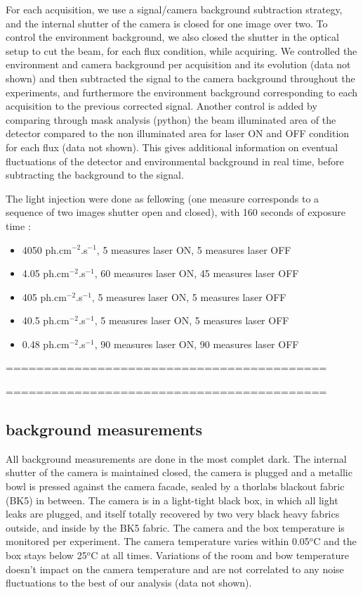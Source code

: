 \documentclass{article}
\begin{document}
For each acquisition, we use a signal/camera background subtraction strategy, and the internal shutter of the camera is closed for one image over two. 
To control the environment background, we also closed the shutter in the optical setup to cut the beam, for each flux condition, while acquiring.
We controlled the environment and camera background per acquisition and its evolution (data not shown) and then subtracted the signal to the camera background throughout the experiments, and furthermore the environment background corresponding to each acquisition to the previous corrected signal.
Another control is added by comparing through mask analysis (python) the beam illuminated area of the detector compared to the non illuminated area for laser ON and OFF condition for each flux (data not shown). 
This gives additional information on eventual fluctuations of the detector and environmental background in real time, before subtracting the background to the signal.


The light injection were done as fellowing (one measure corresponds to a sequence of two images shutter open and closed), with 160 seconds of exposure time : 
\begin{itemize}
	\item  4050 ph.cm$^{-2}$.s$^{-1}$, 5 measures laser ON, 5 measures laser OFF
	\item  4.05 ph.cm$^{-2}$.s$^{-1}$, 60 measures laser ON, 45 measures laser OFF
	\item  405 ph.cm$^{-2}$.s$^{-1}$, 5 measures laser ON, 5 measures laser OFF
	\item  40.5 ph.cm$^{-2}$.s$^{-1}$, 5 measures laser ON, 5 measures laser OFF
	\item  0.48 ph.cm$^{-2}$.s$^{-1}$, 90 measures laser ON, 90 measures laser OFF
\end{itemize}




==========================================

==========================================

\subsection{background measurements}

All background measurements are done in the most complet dark.
The internal shutter of the camera is maintained closed, the camera is plugged and a metallic bowl is pressed against the camera facade, sealed by a thorlabs blackout fabric (BK5) in between.
The camera is in a light-tight black box, in which all light leaks are plugged, and itself totally recovered by two very black heavy fabrics outside, and inside by the BK5 fabric.
The camera and the box temperature is monitored per experiment. 
The camera temperature varies within 0.05$^o$C and the box stays below 25$^o$C at all times. Variations of the room and bow temperature doesn't impact on the camera temperature and are not correlated to any noise fluctuations to the best of our analysis (data not shown).
\end{document}
